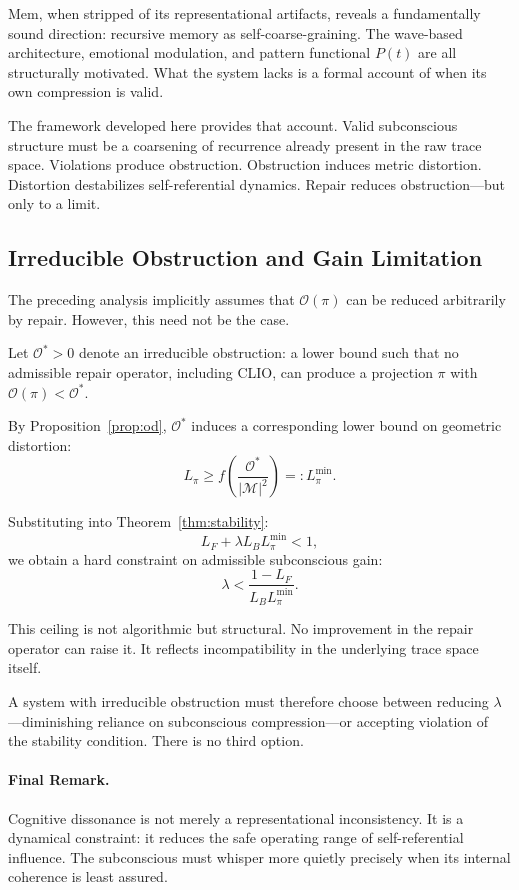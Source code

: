 \documentclass[12pt,a4paper]{article}
\begin{document}
Mem, when stripped of its representational artifacts, reveals a fundamentally sound direction: recursive memory as self-coarse-graining. The wave-based architecture, emotional modulation, and pattern functional $P(t)$ are all structurally motivated. What the system lacks is a formal account of when its own compression is valid.

The framework developed here provides that account. Valid subconscious structure must be a coarsening of recurrence already present in the raw trace space. Violations produce obstruction. Obstruction induces metric distortion. Distortion destabilizes self-referential dynamics. Repair reduces obstruction---but only to a limit.

\subsection*{Irreducible Obstruction and Gain Limitation}

The preceding analysis implicitly assumes that $\mathcal{O}(\pi)$ can be reduced arbitrarily by repair. However, this need not be the case.

Let $\mathcal{O}^* > 0$ denote an irreducible obstruction: a lower bound such that no admissible repair operator, including CLIO, can produce a projection $\pi$ with $\mathcal{O}(\pi) < \mathcal{O}^*$.

By Proposition~\ref{prop:od}, $\mathcal{O}^*$ induces a corresponding lower bound on geometric distortion:
\[
L_\pi \geq f\!\left(\frac{\mathcal{O}^*}{|\mathcal{M}|^2}\right) =: L_\pi^{\min}.
\]

Substituting into Theorem~\ref{thm:stability}:
\[
L_F + \lambda L_B L_\pi^{\min} < 1,
\]
we obtain a hard constraint on admissible subconscious gain:
\[
\lambda < \frac{1 - L_F}{L_B L_\pi^{\min}}.
\]

This ceiling is not algorithmic but structural. No improvement in the repair operator can raise it. It reflects incompatibility in the underlying trace space itself.

A system with irreducible obstruction must therefore choose between reducing $\lambda$---diminishing reliance on subconscious compression---or accepting violation of the stability condition. There is no third option.

\paragraph{Final Remark.}
Cognitive dissonance is not merely a representational inconsistency. It is a dynamical constraint: it reduces the safe operating range of self-referential influence. The subconscious must whisper more quietly precisely when its internal coherence is least assured.
\end{document}

